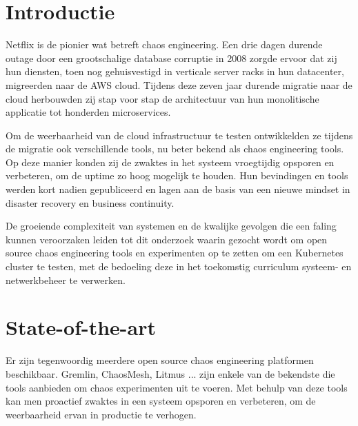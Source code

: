 
\section{Introductie} %
\label{sec:introductie}

Netflix is de pionier wat betreft chaos engineering. Een drie dagen durende outage door een grootschalige database corruptie in 2008 zorgde ervoor dat zij hun diensten, toen nog gehuisvestigd in verticale server racks in hun datacenter, migreerden naar de AWS cloud. Tijdens deze zeven jaar durende migratie naar de cloud herbouwden zij stap voor stap de architectuur van hun monolitische applicatie tot honderden microservices.
  
Om de weerbaarheid van de cloud infrastructuur te testen ontwikkelden ze tijdens de migratie ook verschillende tools, nu beter bekend als chaos engineering tools. Op deze manier konden zij de zwaktes in het systeem vroegtijdig opsporen en verbeteren, om de uptime zo hoog mogelijk te houden. Hun bevindingen en tools werden kort nadien gepubliceerd en lagen aan de basis van een nieuwe mindset in disaster recovery en business continuity. \autocite{Izrailevsky2016}    
 
De groeiende complexiteit van systemen en de kwalijke gevolgen die een faling kunnen veroorzaken leiden tot dit onderzoek waarin gezocht wordt om open source chaos engineering tools en experimenten op te zetten om een Kubernetes cluster te testen, met de bedoeling deze in het toekomstig curriculum systeem- en netwerkbeheer te verwerken. 
 
 

\section{State-of-the-art}
\label{sec:state-of-the-art}

Er zijn tegenwoordig meerdere open source chaos engineering platformen beschikbaar. Gremlin, ChaosMesh, Litmus ... zijn enkele van de bekendste die tools aanbieden om chaos experimenten uit te voeren. Met behulp van deze tools kan men proactief zwaktes in een systeem opsporen en verbeteren, om de weerbaarheid ervan in productie te verhogen.

